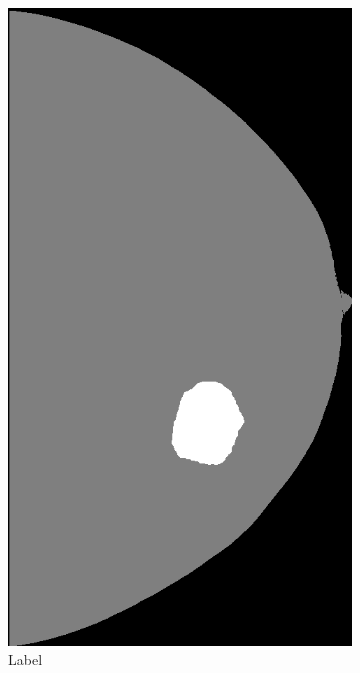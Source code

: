 \documentclass{beamer}
\begin{document}
\begin{frame}
\begin{figure}
            \begin{subfigure}{0.134\textwidth}
	            \centering
		            \includegraphics[width=\textwidth]{plots/examples/label_5.png}
		        \caption*{\footnotesize Label}
            \end{subfigure}
            \begin{subfigure}{0.134\textwidth}
	            \centering

\end{subfigure}
\end{figure}
\end{frame}
\end{document}
